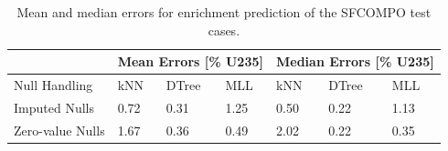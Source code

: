 \begin{table}[!htb]
  \centering
  \begin{tabular}{@{}m{1.5in}llllll@{}}
    \toprule
                     & \multicolumn{3}{m{2in}}{Mean Errors [\% U235]} & \multicolumn{3}{l}{Median Errors [\% U235]} \\ \toprule
    Null Handling    & kNN           & DTree          & MLL          & kNN            & DTree          & MLL    \\ \midrule
    Imputed Nulls    & 0.72          & 0.31           & 1.25         & 0.50           & 0.22           & 1.13   \\
    Zero-value Nulls & 1.67          & 0.36           & 0.49         & 2.02           & 0.22           & 0.35   \\ \bottomrule
  \end{tabular}
  \caption{Mean and median errors for enrichment prediction of the \gls{SFCOMPO} 
           test cases.}
  \label{tbl:sfcoenri}
\end{table}

